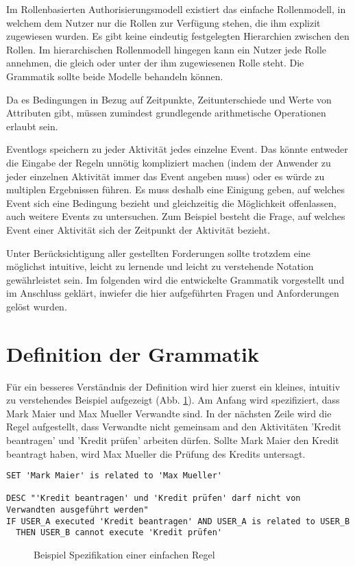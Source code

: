 Im Rollenbasierten Authorisierungsmodell existiert das einfache Rollenmodell, in welchem dem Nutzer nur die Rollen zur Verfügung stehen, die ihm explizit zugewiesen wurden. Es gibt keine eindeutig festgelegten Hierarchien zwischen den Rollen. Im hierarchischen Rollenmodell hingegen kann ein Nutzer jede Rolle annehmen, die gleich oder unter der ihm zugewiesenen Rolle steht. Die Grammatik sollte beide Modelle behandeln können.

Da es Bedingungen in Bezug auf Zeitpunkte, Zeitunterschiede und Werte von Attributen gibt, müssen zumindest grundlegende arithmetische Operationen erlaubt sein.

Eventlogs speichern zu jeder Aktivität jedes einzelne Event. Das könnte entweder die Eingabe der Regeln unnötig kompliziert machen (indem der Anwender zu jeder einzelnen Aktivität immer das Event angeben muss) oder es würde zu multiplen Ergebnissen führen. Es muss deshalb eine Einigung geben, auf welches Event sich eine Bedingung bezieht und gleichzeitig die Möglichkeit offenlassen, auch weitere Events zu untersuchen. Zum Beispiel besteht die Frage, auf welches Event einer Aktivität sich der Zeitpunkt der Aktivität bezieht.

Unter Berücksichtigung aller gestellten Forderungen sollte trotzdem eine möglichst intuitive, leicht zu lernende und leicht zu verstehende Notation gewährleistet sein. Im folgenden wird die entwickelte Grammatik vorgestellt und im Anschluss geklärt, inwiefer die hier aufgeführten Fragen und Anforderungen gelöst wurden.
%
%
\section{Definition der Grammatik}
Für ein besseres Verständnis der Definition wird hier zuerst ein kleines, intuitiv zu verstehendes Beispiel aufgezeigt (Abb. \ref{fig:demorulefile}). Am Anfang wird spezifiziert, dass Mark Maier und Max Mueller Verwandte sind. In der nächsten Zeile wird die Regel aufgestellt, dass Verwandte nicht gemeinsam and den Aktivitäten 'Kredit beantragen' und 'Kredit prüfen' arbeiten dürfen. Sollte Mark Maier den Kredit beantragt haben, wird Max Mueller die Prüfung des Kredits untersagt.\\

\begin{verbatim}
SET 'Mark Maier' is related to 'Max Mueller'

DESC "'Kredit beantragen' und 'Kredit prüfen' darf nicht von Verwandten ausgeführt werden"
IF USER_A executed 'Kredit beantragen' AND USER_A is related to USER_B
  THEN USER_B cannot execute 'Kredit prüfen'
\end{verbatim}
\begin{figure}[!h]
\caption{Beispiel Spezifikation einer einfachen Regel}
\label{fig:demorulefile}
\end{figure}


